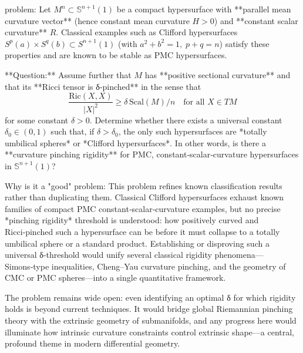 problem:  
Let \(M^n \subset \mathbb{S}^{n+1}(1)\) be a compact hypersurface with **parallel mean curvature vector** (hence constant mean curvature \(H > 0\)) and **constant scalar curvature** \(R\). Classical examples such as Clifford hypersurfaces \(S^p(a)\times S^q(b)\subset S^{n+1}(1)\) (with \(a^2+b^2=1,\; p+q=n\)) satisfy these properties and are known to be stable as PMC hypersurfaces.  

**Question:**  
Assume further that \(M\) has **positive sectional curvature** and that its **Ricci tensor is δ‑pinched** in the sense that  
\[
\frac{\mathrm{Ric}(X,X)}{|X|^2} \geq \delta \, \mathrm{Scal}(M)/n \quad \text{for all } X \in TM
\]
for some constant \( \delta > 0\).  
Determine whether there exists a universal constant \( \delta_0 \in (0,1) \) such that, if \( \delta > \delta_0 \), the only such hypersurfaces are *totally umbilical spheres* or *Clifford hypersurfaces*.  
In other words, is there a **curvature pinching rigidity** for PMC, constant‑scalar‑curvature hypersurfaces in \(\mathbb{S}^{n+1}(1)\)?  

Why is it a "good" problem:  
This problem refines known classification results rather than duplicating them. Classical Clifford hypersurfaces exhaust known families of compact PMC constant‑scalar‑curvature examples, but no precise *pinching rigidity* threshold is understood: how positively curved and Ricci‑pinched such a hypersurface can be before it must collapse to a totally umbilical sphere or a standard product. Establishing or disproving such a universal δ‑threshold would unify several classical rigidity phenomena—Simons‑type inequalities, Cheng–Yau curvature pinching, and the geometry of CMC or PMC spheres—into a single quantitative framework.  

The problem remains wide open: even identifying an optimal δ for which rigidity holds is beyond current techniques. It would bridge global Riemannian pinching theory with the extrinsic geometry of submanifolds, and any progress here would illuminate how intrinsic curvature constraints control extrinsic shape—a central, profound theme in modern differential geometry.